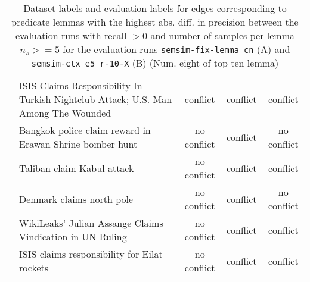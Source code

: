 \begin{sidewaystable}[ht]
\begin{tabular}{l p{13cm} ccc}
& ISIS Claims Responsibility In Turkish Nightclub Attack; U.S. Man Among The Wounded & conflict & conflict & conflict \\
& Bangkok police claim reward in Erawan Shrine bomber hunt & no conflict & conflict & no conflict \\
& Taliban claim Kabul attack & no conflict & conflict & conflict \\
& Denmark claims north pole & no conflict & conflict & no conflict \\
& WikiLeaks' Julian Assange Claims Vindication in UN Ruling & no conflict & conflict & conflict \\
& ISIS claims responsibility for Eilat rockets & no conflict & conflict & conflict \\
\bottomrule
\end{tabular}
\caption{Dataset labels and evaluation labels for edges corresponding to predicate lemmas with the highest abs. diff. in precision between the evaluation runs with recall \(> 0\) and number of samples per lemma \(n_s >= 5\) for the evaluation runs \texttt{semsim-fix-lemma cn} (A) and \texttt{semsim-ctx e5 r-10-X} (B) (Num. eight of top ten lemma)}
\end{sidewaystable}


